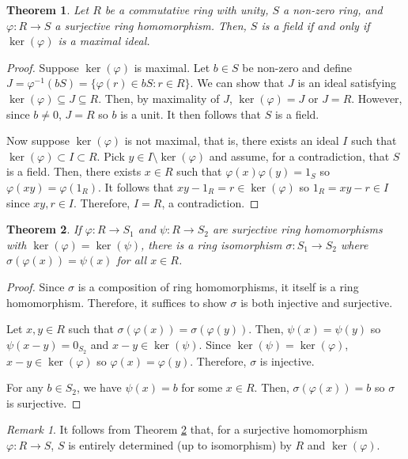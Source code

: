 \documentclass[parskip=half]{scrartcl}  %
\theoremstyle{definition}
\theoremstyle{plain}
\newtheorem{theorem}{Theorem}[definition]
\theoremstyle{remark}
\newtheorem{remark}{Remark}[definition]
\begin{document}
\begin{theorem}
    Let $R$ be a commutative ring with unity, $S$ a non-zero ring, and $\varphi:R\to S$ a
    surjective ring homomorphism.
    Then, $S$ is a field if and only if $\ker(\varphi)$ is a maximal ideal.
\end{theorem}

\begin{proof}
    Suppose $\ker(\varphi)$ is maximal.
    Let $b\in S$ be non-zero and define $J=\varphi^{-1}(bS)=\{\varphi(r)\in bS:r\in R\}$.
    We can show that $J$ is an ideal satisfying $\ker(\varphi)\subseteq J\subseteq R$.
    Then, by maximality of $J$, $\ker(\varphi)=J$ or $J=R$.
    However, since $b\neq 0$, $J=R$ so $b$ is a unit.
    It then follows that $S$ is a field.

    Now suppose $\ker(\varphi)$ is not maximal, that is, there exists an ideal $I$ such that
    $\ker(\varphi)\subset I\subset R$.
    Pick $y\in I\setminus\ker(\varphi)$ and assume, for a contradiction, that $S$ is a field.
    Then, there exists $x\in R$ such that $\varphi(x)\varphi(y)=1_S$ so $\varphi(xy)=\varphi(1_R)$.
    It follows that $xy-1_R=r\in\ker(\varphi)$ so $1_R=xy-r\in I$ since $xy,r\in I$.
    Therefore, $I=R$, a contradiction.
\end{proof}

\begin{theorem}
    \label{thm:isomorphism}
    If $\varphi:R\to S_1$ and $\psi:R\to S_2$ are surjective ring homomorphisms with
    $\ker(\varphi)=\ker(\psi)$, there is a ring isomorphism $\sigma:S_1\to S_2$ where
    $\sigma(\varphi(x))=\psi(x)$ for all $x\in R$.
\end{theorem}

\begin{proof}
    Since $\sigma$ is a composition of ring homomorphisms, it itself is a ring homomorphism.
    Therefore, it suffices to show $\sigma$ is both injective and surjective.

    Let $x,y\in R$ such that $\sigma(\varphi(x))=\sigma(\varphi(y))$.
    Then, $\psi(x)=\psi(y)$ so $\psi(x-y)=0_{S_2}$ and $x-y\in\ker(\psi)$.
    Since $\ker(\psi)=\ker(\varphi)$, $x-y\in\ker(\varphi)$ so $\varphi(x)=\varphi(y)$.
    Therefore, $\sigma$ is injective.

    For any $b\in S_2$, we have $\psi(x)=b$ for some $x\in R$.
    Then, $\sigma(\varphi(x))=b$ so $\sigma$ is surjective.
\end{proof}

\begin{remark}
    It follows from Theorem \ref{thm:isomorphism} that, for a surjective homomorphism
    $\varphi:R\to S$, $S$ is entirely determined (up to isomorphism) by $R$ and $\ker(\varphi)$.
\end{remark}
\end{document}
